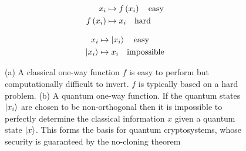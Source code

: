 \begin{figure}[h!]
\centering
\captionsetup{width=0.8\linewidth}
\begin{framed}
\begin{subfigure}{0.49\linewidth}
\begin{align*}
x_i &\mapsto f\left(x_i\right) \qq{easy} \\
f\left(x_i\right) &\mapsto x_i \qq{hard}
\end{align*}
\caption{}
\end{subfigure}
\begin{subfigure}{0.49\linewidth}
\begin{align*}
x_i &\mapsto \ket{x_i} \qq{easy}\\
\ket{x_i} &\mapsto x_i \qq{impossible}
\end{align*}
\caption{}
\end{subfigure}
\caption{(a) A classical one-way function $f$ is easy to perform but computationally difficult to invert. $f$ is typically based on a hard problem. (b) A quantum one-way function. If the quantum states $\ket{x_i}$ are chosen to be non-orthogonal then it is impossible to perfectly determine the classical information $x$ given a quantum state $\ket{x}$. This forms the basis for quantum cryptosystems, whose security is guaranteed by the no-cloning theorem \cite{Nielsen2010, bredon_book}}
\label{fig:qutrapdoor}
\end{framed}
\end{figure}









